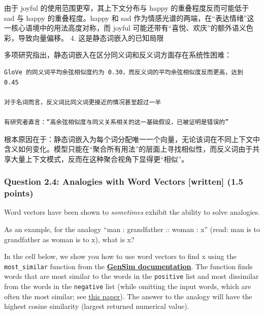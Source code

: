 \documentclass[11pt]{article}
\begin{document}
由于 joyful 的使用范围更窄，其上下文分布与 happy 的重叠程度反而可能低于
sad 与 happy 的重叠程度。happy 和 sad
作为情感光谱的两端，在``表达情绪''这一核心语境中的用法高度对称，而
joyful 可能还带有``喜悦、欢庆''的额外语义色彩，导致向量偏移。 4.
这是静态词嵌入的已知局限

多项研究指出，静态词嵌入在区分同义词和反义词方面存在系统性困难：

\begin{verbatim}
GloVe 的同义词平均余弦相似度约为 0.30，而反义词的平均余弦相似度反而更高，达到 0.45

对于名词而言，反义词比同义词更接近的情况甚至超过一半

有研究者直言：“高余弦相似度与同义关系相关的这一基础假设，已被证明是错误的”
\end{verbatim}

根本原因在于：静态词嵌入为每个词分配唯一一个向量，无论该词在不同上下文中含义如何变化。模型只能在``聚合所有用法''的层面上寻找相似性，而反义词由于共享大量上下文模式，反而在这种聚合视角下显得更``相似''。

    \subsubsection{Question 2.4: Analogies with Word Vectors {[}written{]}
(1.5
points)}\label{question-2.4-analogies-with-word-vectors-written-1.5-points}

Word vectors have been shown to \emph{sometimes} exhibit the ability to
solve analogies.

As an example, for the analogy ``man : grandfather :: woman : x'' (read:
man is to grandfather as woman is to x), what is x?

In the cell below, we show you how to use word vectors to find x using
the \texttt{most\_similar} function from the
\textbf{\href{https://radimrehurek.com/gensim/models/keyedvectors.html\#gensim.models.keyedvectors.KeyedVectors.most_similar}{GenSim
documentation}}. The function finds words that are most similar to the
words in the \texttt{positive} list and most dissimilar from the words
in the \texttt{negative} list (while omitting the input words, which are
often the most similar; see
\href{https://www.aclweb.org/anthology/N18-2039.pdf}{this paper}). The
answer to the analogy will have the highest cosine similarity (largest
returned numerical value).
\end{document}
